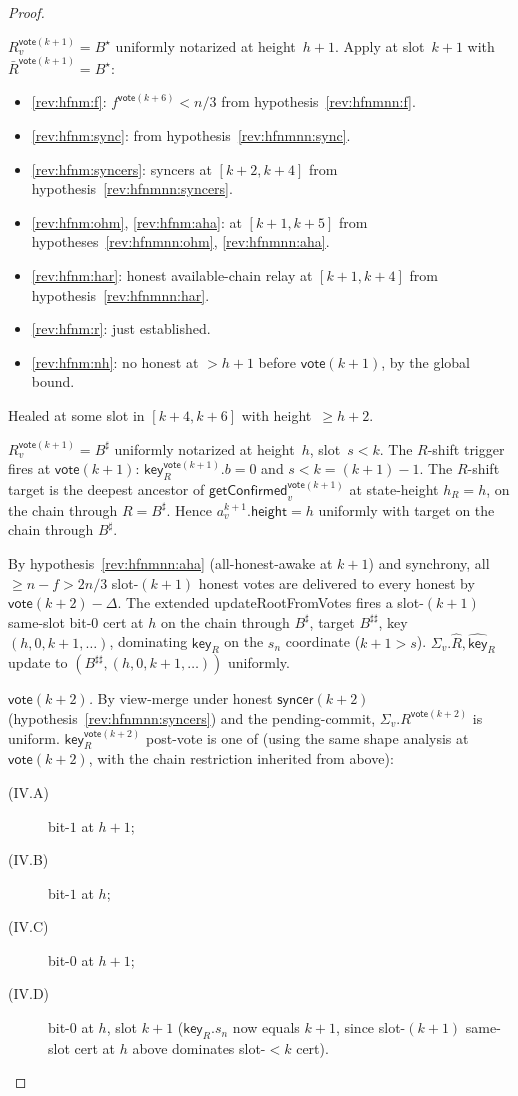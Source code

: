 \documentclass{article}
\newcommand{\height}{\mathsf{height}}
\newcommand{\key}{\mathsf{key}}
\newcommand{\syncer}{\mathsf{syncer}}
\newcommand{\vote}{\mathsf{vote}}
\newcommand{\comm}[1]{\bar{#1}}
\newcommand{\updateRootFromVotes}{\textsf{updateRootFromVotes}\xspace}
\newcommand{\getConfirmed}{\textsf{getConfirmed}\xspace}
\theoremstyle{plain}
\theoremstyle{definition}
\theoremstyle{remark}
\newcommand{\HAR}{honest available-chain relay\xspace}
\newcommand{\AHA}{all-honest-awake\xspace}
\begin{document}
\begin{proof}
\begin{description}
$R_v^{\vote(k+1)} = B^\star$ uniformly notarized at height~$h+1$. Apply  at slot~$k+1$ with $\comm{R}^{\vote(k+1)} = B^\star$:
\begin{itemize}
  \item \ref{rev:hfnm:f}: $f^{\vote(k+6)} < n/3$ from hypothesis~\ref{rev:hfnmnn:f}.
  \item \ref{rev:hfnm:sync}: from hypothesis~\ref{rev:hfnmnn:sync}.
  \item \ref{rev:hfnm:syncers}: syncers at $[k+2, k+4]$ from hypothesis~\ref{rev:hfnmnn:syncers}.
  \item \ref{rev:hfnm:ohm}, \ref{rev:hfnm:aha}: at $[k+1, k+5]$ from hypotheses~\ref{rev:hfnmnn:ohm}, \ref{rev:hfnmnn:aha}.
  \item \ref{rev:hfnm:har}: \HAR at $[k+1, k+4]$ from hypothesis~\ref{rev:hfnmnn:har}.
  \item \ref{rev:hfnm:r}: just established.
  \item \ref{rev:hfnm:nh}: no honest at $> h+1$ before $\vote(k+1)$, by the global bound.
\end{itemize}
Healed at some slot in $[k+4, k+6]$ with height~$\geq h+2$.

\item[{Case (IV): $\key_R$ is bit-$0$ at $h$, slot $s < k$.}]\hfill

$R_v^{\vote(k+1)} = B^\sharp$ uniformly notarized at height~$h$, slot~$s < k$. The $R$-shift trigger fires at $\vote(k+1)$: $\key_R^{\vote(k+1)}.b = 0$ and $s < k = (k+1) - 1$. The $R$-shift target is the deepest ancestor of $\getConfirmed_v^{\vote(k+1)}$ at state-height $h_R = h$, on the chain through $R = B^\sharp$. Hence $a^{k+1}_v.\height = h$ uniformly with target on the chain through $B^\sharp$.

By hypothesis~\ref{rev:hfnmnn:aha} (\AHA at $k+1$) and synchrony, all $\geq n - f > 2n/3$ slot-$(k+1)$ honest votes are delivered to every honest by $\vote(k+2) - \Delta$. The extended \updateRootFromVotes{} fires a slot-$(k+1)$ same-slot bit-$0$ cert at $h$ on the chain through $B^\sharp$, target $B^{\sharp\sharp}$, key $(h, 0, k+1, \ldots)$, dominating $\key_R$ on the $s_n$ coordinate ($k+1 > s$). $\Sigma_v.\hat{R}, \hat{\key}_R$ update to $(B^{\sharp\sharp}, (h, 0, k+1, \ldots))$ uniformly.

\emph{$\vote(k+2)$.}
By view-merge under honest $\syncer(k+2)$ (hypothesis~\ref{rev:hfnmnn:syncers}) and the pending-commit, $\Sigma_v.R^{\vote(k+2)}$ is uniform. $\key_R^{\vote(k+2)}$ post-vote is one of (using the same shape analysis at $\vote(k+2)$, with the chain restriction inherited from above):
\begin{description}
  \item[(IV.A)] bit-$1$ at $h+1$;
  \item[(IV.B)] bit-$1$ at $h$;
  \item[(IV.C)] bit-$0$ at $h+1$;
  \item[(IV.D)] bit-$0$ at $h$, slot $k+1$ ($\key_R.s_n$ now equals $k+1$, since slot-$(k+1)$ same-slot cert at $h$ above dominates slot-$<k$ cert).
\end{description}


\end{description}
\end{proof}
\end{document}
